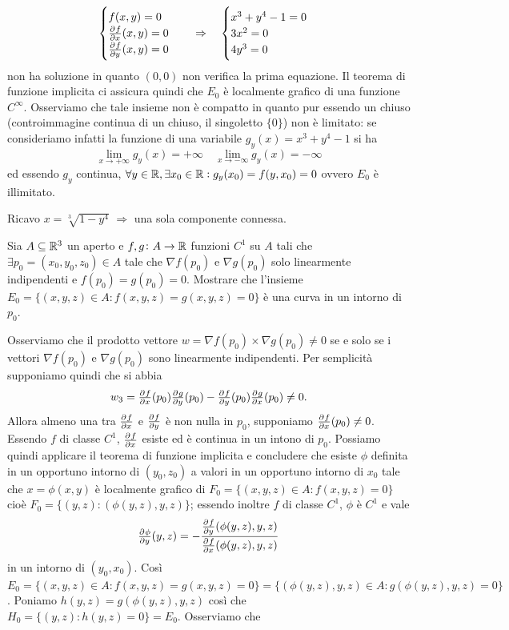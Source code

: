 \documentclass[a4paper]{article}\par \usepackage{style}\par
\begin{document}
\begin{equation*}
  \begin{cases}
    f(x, y) = 0 \\
    \pd[]{f}{x}(x, y) = 0 \\
    \pd[]{f}{y}(x, y) = 0 \\
  \end{cases}
  \quad \Rightarrow \quad
  \begin{cases}
    x^3 + y^4 - 1 = 0 \\
    3x^2 = 0 \\
    4y^3 = 0 \\
  \end{cases}
\end{equation*}
non ha soluzione in quanto $ (0, 0) $ non verifica la prima equazione. Il teorema di funzione implicita ci assicura quindi che $ E_0 $ è localmente grafico di una funzione $ C^{\infty} $. Osserviamo che tale insieme non è compatto in quanto pur essendo un chiuso (controimmagine continua di un chiuso, il singoletto $ \{0\} $) non è limitato: se consideriamo infatti la funzione di una variabile $ g_y(x) = x^3 + y^4 - 1 $ si ha \[\lim_{x \to +\infty} g_y(x) = +\infty \quad \lim_{x \to -\infty} g_y(x) = -\infty\] ed essendo $ g_y $ continua, $ \forall y \in \mathbb{R}, \exists x_0 \in \mathbb{R} : g_y(x_0) = f(y, x_0) = 0 $ ovvero $ E_0 $ è illimitato.\par Ricavo $ x = \sqrt[3]{1 - y^4} $ $ \Rightarrow $ una sola componente connessa.\par \begin{es}
  Sia $ A \subseteq \mathbb{R}^3 $ un aperto e $ f, g \colon A \to \mathbb{R} $ funzioni $ C^1 $ su $ A $ tali che $ \exists p_0 = (x_0, y_0, z_0) \in A $ tale che $ \nabla{f(p_0)} $ e $ \nabla{g(p_0)} $ solo linearmente indipendenti e $ f(p_0) = g(p_0) = 0 $. Mostrare che l'insieme $ E_0 = \{(x, y, z) \in A : f(x, y, z) = g(x, y, z) = 0\} $ è una curva in un intorno di $ p_0 .$
\end{es}\par Osserviamo che il prodotto vettore $ w = \nabla{f(p_0)} \times \nabla{g(p_0)} \neq 0 $ se e solo se i vettori $ \nabla{f(p_0)} $ e $ \nabla{g(p_0)} $ sono linearmente indipendenti. Per semplicità supponiamo quindi che si abbia \[w_3 = \pd{f}{x}(p_0) \pd{g}{y}(p_0) - \pd{f}{y}(p_0)\pd{g}{x}(p_0) \neq 0.\] Allora almeno una tra $ \pd{f}{x} $ e $ \pd{f}{y} $ è non nulla in $ p_0 $, supponiamo $ \pd{f}{x}(p_0) \neq 0 $. Essendo $ f $ di classe $ C^1 $, $ \pd{f}{x} $ esiste ed è continua in un intono di $ p_0 $. Possiamo quindi applicare il teorema di funzione implicita e concludere che esiste $ \phi $ definita in un opportuno intorno di $ (y_0, z_0) $ a valori in un opportuno intorno di $ x_0 $  tale che $ x = \phi(x, y) $ è localmente grafico di $ F_0 = \{(x, y, z) \in A : f(x, y, z) = 0\} $ cioè $ F_0 = \{(y, z) : (\phi(y, z), y, z)\} $; essendo inoltre $ f $ di classe $ C^1 $, $ \phi $ è $ C^1 $ e vale \[\pd{\phi}{y}(y, z) = -\frac{\pd{f}{y}(\phi(y, z), y, z)}{\pd{f}{x}(\phi(y, z), y, z)}\] in un intorno di $ (y_0, x_0) $. Così $ E_0 = \{(x, y, z) \in A : f(x, y, z) = g(x, y, z) = 0\} = \{(\phi(y, z), y, z) \in A : g(\phi(y, z), y, z) = 0\} $. Poniamo $ h(y, z) = g(\phi(y, z), y, z) $ così che $ H_0 = \{(y, z) : h(y, z) = 0\} = E_0 $. Osserviamo che
\end{document}
